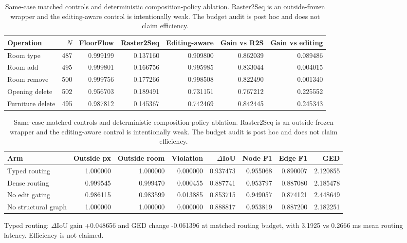 \begin{table}[t]
\centering
\caption{Same-case matched controls and deterministic composition-policy ablation. Raster2Seq is an outside-frozen wrapper and the editing-aware control is intentionally weak. The budget audit is post hoc and does not claim efficiency.}
\label{tab:matched}
\small
\begin{tabular}{lrrrrrr}
\toprule
Operation & $N$ & FloorFlow & Raster2Seq & Editing-aware & Gain vs R2S & Gain vs editing \\
\midrule
Room type & 487 & 0.999199 & 0.137160 & 0.909800 & 0.862039 & 0.089486 \\
Room add & 495 & 0.999801 & 0.166756 & 0.995985 & 0.833044 & 0.004015 \\
Room remove & 500 & 0.999756 & 0.177266 & 0.998508 & 0.822490 & 0.001340 \\
Opening delete & 502 & 0.956703 & 0.189491 & 0.731151 & 0.767212 & 0.225552 \\
Furniture delete & 495 & 0.987812 & 0.145367 & 0.742469 & 0.842445 & 0.245343 \\
\bottomrule
\end{tabular}
\par\medskip
\begin{tabular}{lrrrrrrr}
\toprule
Arm & Outside px & Outside room & Violation & $\Delta$IoU & Node F1 & Edge F1 & GED \\
\midrule
Typed routing & 1.000000 & 1.000000 & 0.000000 & 0.937473 & 0.955068 & 0.890007 & 2.120855 \\
Dense routing & 0.999545 & 0.999470 & 0.000455 & 0.887741 & 0.953797 & 0.887080 & 2.185478 \\
No edit gating & 0.986115 & 0.983599 & 0.013885 & 0.853715 & 0.949057 & 0.874121 & 2.448649 \\
No structural graph & 1.000000 & 1.000000 & 0.000000 & 0.888817 & 0.953819 & 0.887200 & 2.182251 \\
\bottomrule
\end{tabular}
\par\smallskip\footnotesize Typed routing: $\Delta$IoU gain +0.048656 and GED change -0.061396 at matched routing budget, with 3.1925 vs 0.2666 ms mean routing latency. Efficiency is not claimed.
\end{table}
